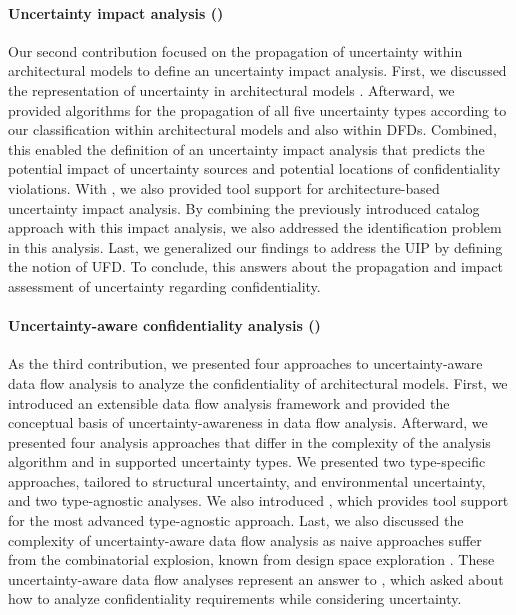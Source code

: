 \paragraph{Uncertainty impact analysis ()}
Our second contribution focused on the propagation of uncertainty within architectural models to define an uncertainty impact analysis.
First, we discussed the representation of uncertainty in architectural models \cite{troya_uncertainty_2021,hahner_architecture-based_2023}.
Afterward, we provided algorithms for the propagation of all five uncertainty types according to our classification within architectural models and also within \acp{DFD}.
Combined, this enabled the definition of an uncertainty impact analysis that predicts the potential impact of uncertainty sources and potential locations of confidentiality violations.
With \uia, we also provided tool support for architecture-based uncertainty impact analysis.
By combining the previously introduced catalog approach with this impact analysis, we also addressed the identification problem in this analysis.
Last, we generalized our findings \cite{camara_uncertainty_2024} to address the \acf{UIP} by defining the notion of \acf{UFD}.
To conclude, this answers  about the propagation and impact assessment of uncertainty regarding confidentiality.



\paragraph{Uncertainty-aware confidentiality analysis ()}
As the third contribution, we presented four approaches to uncertainty-aware data flow analysis to analyze the confidentiality of architectural models.
First, we introduced an extensible data flow analysis framework \cite{boltz_extensible_2024} and provided the conceptual basis of uncertainty-awareness in data flow analysis.
Afterward, we presented four analysis approaches that differ in the complexity of the analysis algorithm and in supported uncertainty types.
We presented two type-specific approaches, tailored to structural uncertainty, and environmental uncertainty, and two type-agnostic analyses.
We also introduced \abunai, which provides tool support for the most advanced type-agnostic approach.
Last, we also discussed the complexity of uncertainty-aware data flow analysis as naive approaches suffer from the combinatorial explosion, known from design space exploration \cite{koziolek_automated_2011}.
These uncertainty-aware data flow analyses represent an answer to , which asked about how to analyze confidentiality requirements while considering uncertainty.

